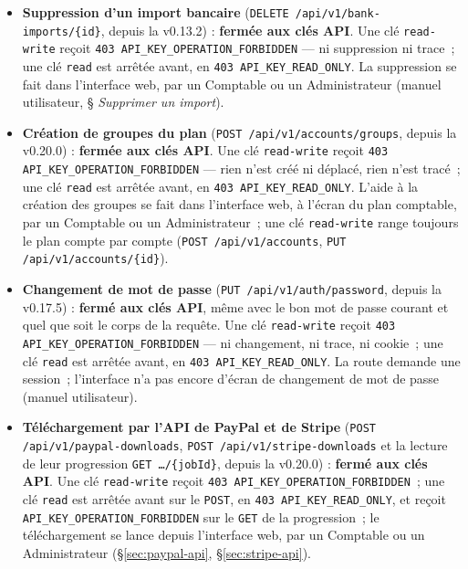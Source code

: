 \documentclass[a4paper,11pt,oneside]{article}
\begin{document}
\begin{itemize}
    \item \textbf{Suppression d'un import bancaire} (\texttt{DELETE /api/v1/bank-imports/\{id\}}, depuis la v0.13.2) : \textbf{fermée aux clés API}. Une clé \texttt{read-write} reçoit \texttt{403 API\_KEY\_OPERATION\_FORBIDDEN} --- ni suppression ni trace~; une clé \texttt{read} est arrêtée avant, en \texttt{403 API\_KEY\_READ\_ONLY}. La suppression se fait dans l'interface web, par un Comptable ou un Administrateur (manuel utilisateur, § \emph{Supprimer un import}).
    \item \textbf{Création de groupes du plan} (\texttt{POST /api/v1/accounts/groups}, depuis la v0.20.0) : \textbf{fermée aux clés API}. Une clé \texttt{read-write} reçoit \texttt{403 API\_KEY\_OPERATION\_FORBIDDEN} --- rien n'est créé ni déplacé, rien n'est tracé~; une clé \texttt{read} est arrêtée avant, en \texttt{403 API\_KEY\_READ\_ONLY}. L'aide à la création des groupes se fait dans l'interface web, à l'écran du plan comptable, par un Comptable ou un Administrateur~; une clé \texttt{read-write} range toujours le plan compte par compte (\texttt{POST /api/v1/accounts}, \texttt{PUT /api/v1/accounts/\{id\}}).
    \item \textbf{Changement de mot de passe} (\texttt{PUT /api/v1/auth/password}, depuis la v0.17.5) : \textbf{fermé aux clés API}, même avec le bon mot de passe courant et quel que soit le corps de la requête. Une clé \texttt{read-write} reçoit \texttt{403 API\_KEY\_OPERATION\_FORBIDDEN} --- ni changement, ni trace, ni cookie~; une clé \texttt{read} est arrêtée avant, en \texttt{403 API\_KEY\_READ\_ONLY}. La route demande une session~; l'interface n'a pas encore d'écran de changement de mot de passe (manuel utilisateur).
    \item \textbf{Téléchargement par l'API de PayPal et de Stripe} (\texttt{POST /api/v1/\allowbreak paypal-downloads}, \texttt{POST /api/v1/\allowbreak stripe-downloads} et la lecture de leur progression \texttt{GET …/\{jobId\}}, depuis la v0.20.0) : \textbf{fermé aux clés API}. Une clé \texttt{read-write} reçoit \texttt{403 API\_KEY\_OPERATION\_FORBIDDEN}~; une clé \texttt{read} est arrêtée avant sur le \texttt{POST}, en \texttt{403 API\_KEY\_READ\_ONLY}, et reçoit \texttt{API\_KEY\_OPERATION\_FORBIDDEN} sur le \texttt{GET} de la progression~; le téléchargement se lance depuis l'interface web, par un Comptable ou un Administrateur (\S\ref{sec:paypal-api}, \S\ref{sec:stripe-api}).

\end{itemize}
\end{document}
